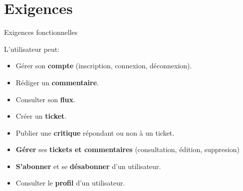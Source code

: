 \section{Exigences}

\begin{frame}{Exigences fonctionnelles}
  \begin{block}{L'utilisateur peut:}
    \begin{itemize}
    \item Gérer son \textbf{compte} {\tiny(inscription, connexion, déconnexion)}.
    \item Rédiger un \textbf{commentaire}.
    \item Consulter son \textbf{flux}.
    \item Créer un \textbf{ticket}.
    \item Publier une \textbf{critique} répondant ou non à un ticket.
    \item \textbf{Gérer} ses \textbf{tickets et commentaires} {\tiny (consultation, édition, suppresion)}
    \item \textbf{S'abonner} et se \textbf{désabonner} d'un utilisateur.
    \item Consulter le \textbf{profil} d'un utilisateur.
    \end{itemize}    
  \end{block}
\end{frame}
